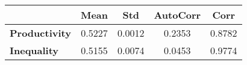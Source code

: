 \begin{tiny}\begin{tabular}{|l|c|c|c|c|}
\hline
&\textbf{Mean}&\textbf{Std}&\textbf{AutoCorr}&\textbf{Corr}\\\hline
\textbf{Productivity}&0.5227&0.0012&0.2353&0.8782\\\hline
\textbf{Inequality}&0.5155&0.0074&0.0453&0.9774\\\hline
\end{tabular}
\end{tiny}